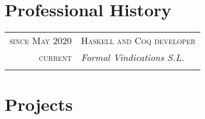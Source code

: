 \documentclass[a4paper,10pt]{article}
\begin{document}
\section{Professional History}
\vspace{0.2cm}
\begin{tabular}{r|p{11cm}}
  \textsc{since May 2020} & \textsc{Haskell and Coq developer} \\
  \textsc{current} & \emph{Formal Vindications S.L.} \\
  \multicolumn{2}{c}{} \\

\end{tabular}

\newpage
\section{Projects}
\end{document}
